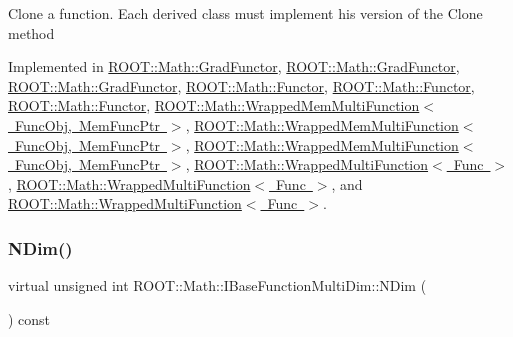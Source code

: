 Clone a function. Each derived class must implement his version of the Clone method 

Implemented in \mbox{\hyperlink{classROOT_1_1Math_1_1GradFunctor_a21093c0d3001069e49ce6278b5a32a40}{R\+O\+O\+T\+::\+Math\+::\+Grad\+Functor}}, \mbox{\hyperlink{classROOT_1_1Math_1_1GradFunctor_a21093c0d3001069e49ce6278b5a32a40}{R\+O\+O\+T\+::\+Math\+::\+Grad\+Functor}}, \mbox{\hyperlink{classROOT_1_1Math_1_1GradFunctor_a21093c0d3001069e49ce6278b5a32a40}{R\+O\+O\+T\+::\+Math\+::\+Grad\+Functor}}, \mbox{\hyperlink{classROOT_1_1Math_1_1Functor_a989f9b6dd160ebe03911cdee00dacaad}{R\+O\+O\+T\+::\+Math\+::\+Functor}}, \mbox{\hyperlink{classROOT_1_1Math_1_1Functor_a989f9b6dd160ebe03911cdee00dacaad}{R\+O\+O\+T\+::\+Math\+::\+Functor}}, \mbox{\hyperlink{classROOT_1_1Math_1_1Functor_a989f9b6dd160ebe03911cdee00dacaad}{R\+O\+O\+T\+::\+Math\+::\+Functor}}, \mbox{\hyperlink{classROOT_1_1Math_1_1WrappedMemMultiFunction_ab9f49fc9a151e8d921dbe9cb148c1fc8}{R\+O\+O\+T\+::\+Math\+::\+Wrapped\+Mem\+Multi\+Function$<$ Func\+Obj, Mem\+Func\+Ptr $>$}}, \mbox{\hyperlink{classROOT_1_1Math_1_1WrappedMemMultiFunction_ab9f49fc9a151e8d921dbe9cb148c1fc8}{R\+O\+O\+T\+::\+Math\+::\+Wrapped\+Mem\+Multi\+Function$<$ Func\+Obj, Mem\+Func\+Ptr $>$}}, \mbox{\hyperlink{classROOT_1_1Math_1_1WrappedMemMultiFunction_ab9f49fc9a151e8d921dbe9cb148c1fc8}{R\+O\+O\+T\+::\+Math\+::\+Wrapped\+Mem\+Multi\+Function$<$ Func\+Obj, Mem\+Func\+Ptr $>$}}, \mbox{\hyperlink{classROOT_1_1Math_1_1WrappedMultiFunction_aafa24e359a607b4278f1bf238bdbc336}{R\+O\+O\+T\+::\+Math\+::\+Wrapped\+Multi\+Function$<$ Func $>$}}, \mbox{\hyperlink{classROOT_1_1Math_1_1WrappedMultiFunction_aafa24e359a607b4278f1bf238bdbc336}{R\+O\+O\+T\+::\+Math\+::\+Wrapped\+Multi\+Function$<$ Func $>$}}, and \mbox{\hyperlink{classROOT_1_1Math_1_1WrappedMultiFunction_aafa24e359a607b4278f1bf238bdbc336}{R\+O\+O\+T\+::\+Math\+::\+Wrapped\+Multi\+Function$<$ Func $>$}}.

\mbox{\label{classROOT_1_1Math_1_1IBaseFunctionMultiDim_a16f37dc7a6d00c75ddeda0697741315d}} 
\subsubsection{\texorpdfstring{NDim()}{NDim()}\hspace{0.1cm}{\footnotesize\ttfamily [1/3]}}
{\footnotesize\ttfamily virtual unsigned int R\+O\+O\+T\+::\+Math\+::\+I\+Base\+Function\+Multi\+Dim\+::\+N\+Dim (\begin{DoxyParamCaption}{ }\end{DoxyParamCaption}) const\hspace{0.3cm}{\ttfamily [pure virtual]}}

